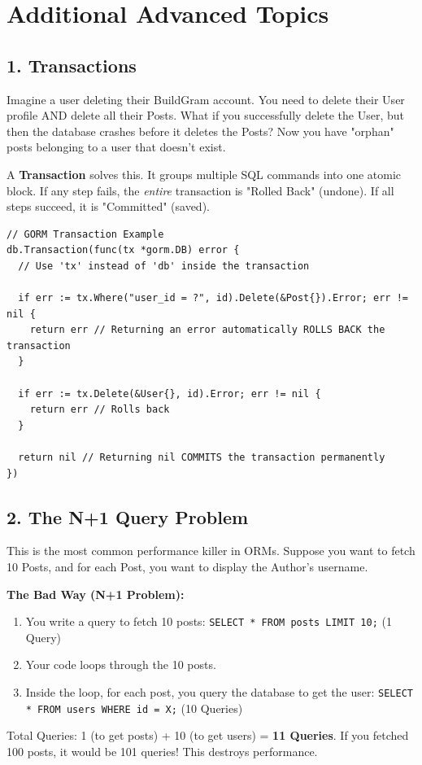 \documentclass[11pt,a4paper]{article}
\begin{document}
\section{Additional Advanced Topics}
\subsection{1. Transactions}
Imagine a user deleting their BuildGram account. You need to delete their User profile AND delete all their Posts. 
What if you successfully delete the User, but then the database crashes before it deletes the Posts? Now you have "orphan" posts belonging to a user that doesn't exist.

A \textbf{Transaction} solves this. It groups multiple SQL commands into one atomic block. If any step fails, the \textit{entire} transaction is "Rolled Back" (undone). If all steps succeed, it is "Committed" (saved).

\begin{lstlisting}
// GORM Transaction Example
db.Transaction(func(tx *gorm.DB) error {
  // Use 'tx' instead of 'db' inside the transaction
  
  if err := tx.Where("user_id = ?", id).Delete(&Post{}).Error; err != nil {
    return err // Returning an error automatically ROLLS BACK the transaction
  }

  if err := tx.Delete(&User{}, id).Error; err != nil {
    return err // Rolls back
  }

  return nil // Returning nil COMMITS the transaction permanently
})
\end{lstlisting}

\subsection{2. The N+1 Query Problem}
This is the most common performance killer in ORMs.
Suppose you want to fetch 10 Posts, and for each Post, you want to display the Author's username.

\textbf{The Bad Way (N+1 Problem):}
\begin{enumerate}
    \item You write a query to fetch 10 posts: \texttt{SELECT * FROM posts LIMIT 10;} (1 Query)
    \item Your code loops through the 10 posts.
    \item Inside the loop, for each post, you query the database to get the user: \texttt{SELECT * FROM users WHERE id = X;} (10 Queries)
\end{enumerate}
Total Queries: 1 (to get posts) + 10 (to get users) = \textbf{11 Queries}.
If you fetched 100 posts, it would be 101 queries! This destroys performance.
\end{document}
